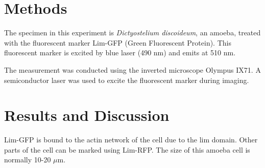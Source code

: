
\section{Methods}

The specimen in this experiment is \textit{Dictyostelium discoideum}, an amoeba, treated with the fluorescent marker Lim-GFP (Green Fluorescent Protein). 
This fluorescent marker is excited by blue laser (490 nm) and emits at 510 nm. 

The measurement was conducted using the inverted microscope Olympus IX71. 
A semiconductor laser was used to excite the fluorescent marker during imaging.
\section{Results and Discussion}
Lim-GFP is bound to the actin network of the cell due to the lim domain. Other parts of the cell can be marked using Lim-RFP.
The size of this amoeba cell is normally 10-20 $\mu$m.

